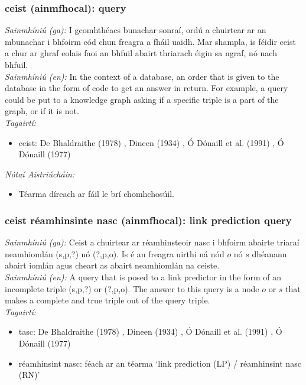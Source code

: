 \subsubsection*{ceist (ainmfhocal): query}
 \noindent \textit{Sainmhíniú (ga):} I gcomhthéacs bunachar sonraí, ordú a chuirtear ar an mbunachar i bhfoirm cód chun freagra a fháil uaidh. Mar shampla, is féidir ceist a chur ar ghraf eolais faoi an bhfuil abairt thriarach éigin sa ngraf, nó nach bhfuil.
\\
 \noindent \textit{Sainmhíniú (en):} In the context of a database, an order that is given to the database in the form of code to get an answer in return. For example, a query could be put to a knowledge graph asking if a specific triple is a part of the graph, or if it is not.
\\
 \noindent \textit{Tagairtí:}
\begin{itemize}
	\item ceist: De Bhaldraithe (1978) \cite{de-bhaldraithe}, Dineen (1934) \cite{dineen}, Ó Dónaill et al. (1991) \cite{focloir-beag}, Ó Dónaill (1977) \cite{odonaill}
\end{itemize}

 \noindent \textit{Nótaí Aistriúcháin:}
\begin{itemize}
	\item Téarma díreach ar fáil le brí chomhchosúil.
\end{itemize}


\subsubsection*{ceist réamhinsinte nasc (ainmfhocal): link prediction query}
 \noindent \textit{Sainmhíniú (ga):} Ceist a chuirtear ar réamhinsteoir nasc i bhfoirm abairte triaraí neamhiomlán (s,p,?) nó (?,p,o). Is é an freagra uirthi ná nód $o$ nó $s$ dhéanann abairt iomlán agus cheart as abairt neamhiomlán na ceiste.
\\
 \noindent \textit{Sainmhíniú (en):} A query that is posed to a link predictor in the form of an incomplete triple (s,p,?) or (?,p,o). The answer to this query is a node $o$ or $s$ that makes a complete and true triple out of the query triple.
\\
 \noindent \textit{Tagairtí:}
\begin{itemize}
	\item tasc: De Bhaldraithe (1978) \cite{de-bhaldraithe}, Dineen (1934) \cite{dineen}, Ó Dónaill et al. (1991) \cite{focloir-beag}, Ó Dónaill (1977) \cite{odonaill}
	\item réamhinsint nasc: féach ar an téarma `link prediction (LP) / réamhinsint nasc (RN)'
\end{itemize}

